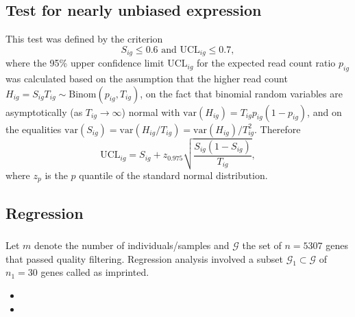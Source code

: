 \documentclass[12pt,letterpaper]{article}
\begin{document}
\subsection{}

\subsection{Test for nearly unbiased expression}

This test was defined by the criterion
\begin{equation}
S_{ig} \le 0.6 \text{ and } \mathrm{UCL}_{ig} \le 0.7,
\label{eq:unbiased-test}
\end{equation}
where the 95\% upper confidence limit \(\mathrm{UCL}_{ig}\) for the expected
read count ratio \(p_{ig}\) was calculated based on the assumption
that the higher read count \(H_{ig}=S_{ig}T_{ig}\sim \mathrm{Binom}(p_{ig},
T_{ig})\), on the fact that binomial random variables are
asymptotically (as \(T_{ig}\rightarrow \infty\)) normal with
\(\mathrm{var}(H_{ig}) = T_{ig}p_{ig}(1-p_{ig})\), and on the equalities
\(\mathrm{var}(S_{ig}) = \mathrm{var}(H_{ig}/T_{ig}) =
\mathrm{var}(H_{ig})/T_{ig}^2\).  Therefore
\begin{equation}
\mathrm{UCL}_{ig} = S_{ig} + z_{0.975} \sqrt{\frac{S_{ig} (1 - S_{ig})}{T_{ig}}},
\end{equation}
where $z_{p}$ is the $p$ quantile of the standard normal distribution.

\subsection{Regression }
\label{sec:methods-regression}

\subsubsection{}

Let \(m\) denote the number of individuals/samples and \(\mathcal{G}\) the set
of \(n=5307\) genes that passed quality filtering.  Regression analysis
involved a subset \(\mathcal{G}_1\subset\mathcal{G}\) of \(n_1=30\) genes
called as imprinted.

\begin{itemize}
\item {}
\item {}
\end{itemize}
\end{document}
